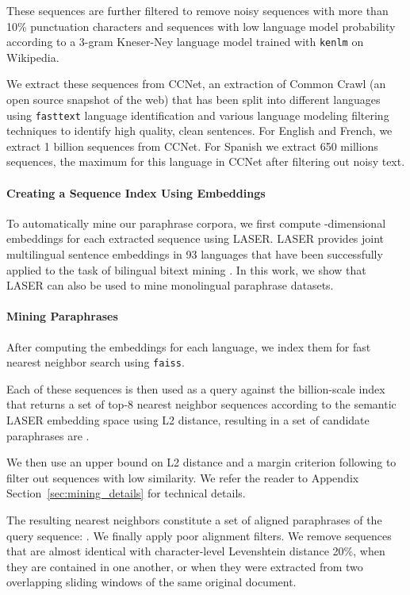 \documentclass[11pt]{article}
\newcommand{\ccnet}{CCNet\xspace}
\newcommand{\laser}{LASER\xspace}
\begin{document}
These sequences are further filtered to remove noisy sequences with more than 10\% punctuation characters and sequences with low language model probability  according to a 3-gram Kneser-Ney language model trained with \texttt{kenlm} \cite{heafield2011kenlm} on Wikipedia.

We extract these sequences from \ccnet \cite{wenzek2019ccnet}, an extraction of Common Crawl (an open source snapshot of the web) that has been split into different languages using \texttt{fasttext} language identification \cite{joulin2017bag} and various language modeling filtering techniques to identify high quality, clean sentences. For English and French, we extract 1 billion sequences from \ccnet. For Spanish we extract 650 millions sequences, the maximum for this language in \ccnet after filtering out noisy text.

\paragraph{Creating a Sequence Index Using Embeddings}
To automatically mine our paraphrase corpora, we first compute -dimensional embeddings for each extracted sequence using \laser \cite{artetxe2019massively}. \laser provides joint multilingual sentence embeddings in 93 languages that have been successfully applied to the task of bilingual bitext mining \cite{schwenk2019ccmatrix}. In this work, we show that \laser can also be used to mine monolingual paraphrase datasets.



\paragraph{Mining Paraphrases}

After computing the embeddings for each language, we index them for fast nearest neighbor search using \texttt{faiss}. 

Each of these sequences is then used as a query  against the billion-scale index that returns a set of top-8 nearest neighbor sequences according to the semantic \laser embedding space using L2 distance, resulting in a set of candidate paraphrases are .

We then use an upper bound on L2 distance and a margin criterion following \cite{artetxe-schwenk-2019-margin} to filter out sequences with low similarity.
We refer the reader to Appendix Section~\ref{sec:mining_details} for technical details.

The resulting nearest neighbors constitute a set of aligned paraphrases of the query sequence: .
We finally apply poor alignment filters. We remove sequences that are almost identical with character-level Levenshtein distance  20\%, when they are contained in one another, or when they were extracted from two overlapping sliding windows of the same original document.
\end{document}

